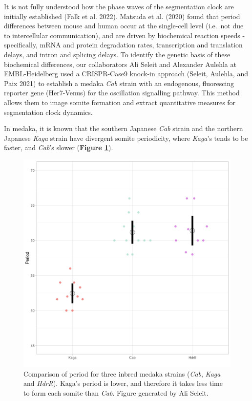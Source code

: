 \documentclass[
]{book}
\begin{document}
It is not fully understood how the phase waves of the segmentation clock are initially established (Falk et al. 2022). Matsuda et al. (2020) found that period differences between mouse and human occur at the single-cell level (i.e.~not due to intercellular communication), and are driven by biochemical reaction speeds - specifically, mRNA and protein degradation rates, transcription and translation delays, and intron and splicing delays. To identify the genetic basis of these biochemical differences, our collaborators Ali Seleit and Alexander Aulehla at EMBL-Heidelberg used a CRISPR-Case9 knock-in approach (Seleit, Aulehla, and Paix 2021) to establish a medaka \emph{Cab} strain with an endogenous, fluorescing reporter gene (Her7-Venus) for the oscillation signalling pathway. This method allows them to image somite formation and extract quantitative measures for segmentation clock dynamics.

In medaka, it is known that the southern Japanese \emph{Cab} strain and the northern Japanese \emph{Kaga} strain have divergent somite periodicity, where \emph{Kaga}'s tends to be faster, and \emph{Cab}'s slower (\textbf{Figure \ref{fig:F0-Cab-Kaga-HdrR}}).



\begin{figure}

{\centering \includegraphics[width=0.5\linewidth]{figs/somites/ali_period_F0_Cab_Kaga} 

}

\caption{Comparison of period for three inbred medaka strains (\emph{Cab}, \emph{Kaga} and \emph{HdrR}). Kaga's period is lower, and therefore it takes less time to form each somite than \emph{Cab}. Figure generated by Ali Seleit.}\label{fig:F0-Cab-Kaga-HdrR}
\end{figure}
\end{document}
